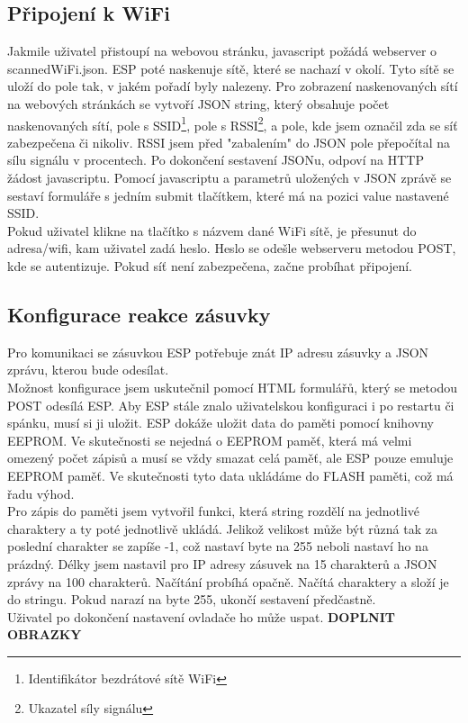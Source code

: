 \documentclass[a4paper, 12pt]{report}
\begin{document}
    \subsection{Připojení k WiFi}
    Jakmile uživatel přistoupí na webovou stránku, javascript požádá webserver o scannedWiFi.json. ESP poté naskenuje sítě, které se nachazí v okolí. Tyto sítě se uloží do pole tak, v jakém pořadí byly nalezeny. Pro zobrazení naskenovaných sítí na webových stránkách se vytvoří JSON string, který obsahuje počet naskenovaných sítí, pole s SSID\footnote{Identifikátor bezdrátové sítě WiFi}, pole s RSSI\footnote{Ukazatel síly signálu}, a pole, kde jsem označil zda se síť zabezpečena či nikoliv. RSSI jsem před "zabalením" do JSON pole přepočítal na sílu signálu v procentech. Po dokončení sestavení JSONu, odpoví na HTTP žádost javascriptu. Pomocí javascriptu a parametrů uložených v JSON zprávě se sestaví formuláře s jedním submit tlačítkem, které má na pozici value nastavené SSID.\\
    Pokud uživatel klikne na tlačítko s názvem dané WiFi sítě, je přesunut do adresa/wifi, kam uživatel zadá heslo. Heslo se odešle webserveru metodou POST, kde se autentizuje. Pokud síť není zabezpečena, začne probíhat připojení.


    \subsection{Konfigurace reakce zásuvky}
    Pro komunikaci se zásuvkou ESP potřebuje znát IP adresu zásuvky a JSON zprávu, kterou bude odesílat.\\ Možnost konfigurace jsem uskutečnil pomocí HTML formulářů, který se metodou POST odesílá ESP. Aby ESP stále znalo uživatelskou konfiguraci i po restartu či spánku, musí si ji uložit. ESP dokáže uložit data do paměti pomocí knihovny EEPROM. Ve skutečnosti se nejedná o EEPROM paměť, která má velmi omezený počet zápisů a musí se vždy smazat celá paměť, ale ESP pouze emuluje EEPROM paměť. Ve skutečnosti tyto data ukládáme do FLASH paměti, což má řadu výhod.\\
    Pro zápis do paměti jsem vytvořil funkci, která string rozdělí na jednotlivé charaktery a ty poté jednotlivě ukládá. Jelikož velikost může být různá tak za poslední charakter se zapíše -1, což nastaví byte na 255 neboli nastaví ho na prázdný. Délky jsem nastavil pro IP adresy zásuvek na 15 charakterů a JSON zprávy na 100 charakterů. Načítání probíhá opačně. Načítá charaktery a složí je do stringu. Pokud narazí na byte 255, ukončí sestavení předčastně.\\
    Uživatel po dokončení nastavení ovladače ho může uspat.
    \textbf{DOPLNIT OBRAZKY}
\end{document}
